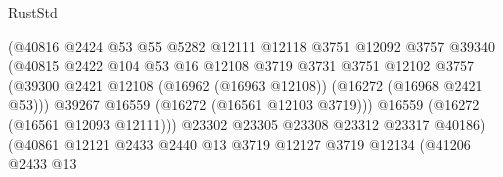 \begin{lexlean}{RustStd}
\begin{coremodule}
                                          (@40816
                                            @2424
                                            @53
                                            @55
                                            @5282
                                            @12111
                                            @12118
                                            @3751
                                            @12092
                                            @3757
                                            @39340
                                            (@40815
                                              @2422
                                              @104
                                              @53
                                              @16
                                              @12108
                                              @3719
                                              @3731
                                              @3751
                                              @12102
                                              @3757
                                              (@39300
                                                @2421
                                                @12108
                                                (@16962 (@16963 @12108))
                                                (@16272 (@16968 @2421 @53)))
                                              @39267
                                              @16559
                                              (@16272 (@16561 @12103 @3719)))
                                            @16559
                                            (@16272 (@16561 @12093 @12111)))
                                          @23302
                                          @23305
                                          @23308
                                          @23312
                                          @23317
                                          @40186)
                                        (@40861
                                          @12121
                                          @2433
                                          @2440
                                          @13
                                          @3719
                                          @12127
                                          @3719
                                          @12134
                                          (@41206
                                            @2433
                                            @13

\end{coremodule}
\end{lexlean}

